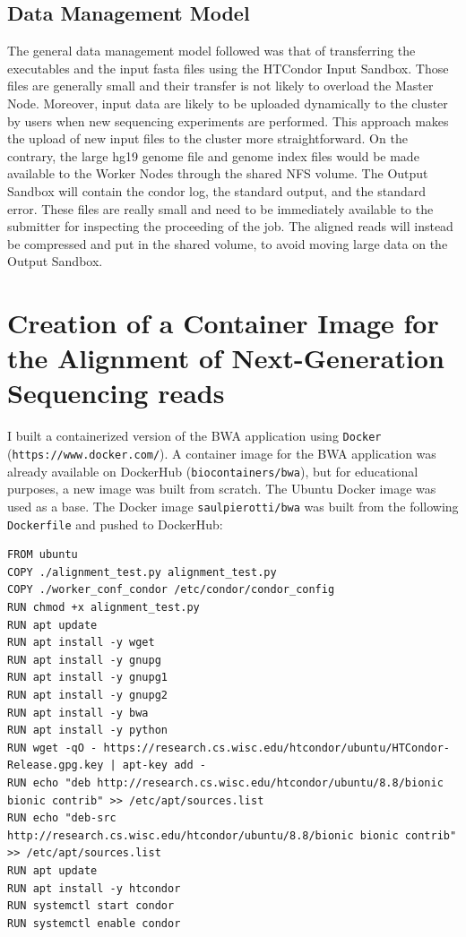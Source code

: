 \documentclass{article}
\begin{document}
\subsection{Data Management Model}
The general data management model followed was that of transferring the executables and the input fasta files using the HTCondor Input Sandbox.
Those files are generally small and their transfer is not likely to overload the Master Node.
Moreover, input data are likely to be uploaded dynamically to the cluster by users when new sequencing experiments are performed.
This approach makes the upload of new input files to the cluster more straightforward.
On the contrary, the large hg19 genome file and genome index files would be made available to the Worker Nodes through the shared NFS volume.
The Output Sandbox will contain the condor log, the standard output, and the standard error.
These files are really small and need to be immediately available to the submitter for inspecting the proceeding of the job.
The aligned reads will instead be compressed and put in the shared volume, to avoid moving large data on the Output Sandbox.

\section{Creation of a Container Image for the Alignment of Next-Generation Sequencing reads}
I built a containerized version of the BWA application using \texttt{Docker} (\texttt{https://www.docker.com/}).
A container image for the BWA application was already available on DockerHub (\texttt{biocontainers/bwa}), but for educational purposes, a new image was built from scratch.
The Ubuntu Docker image was used as a base.
The Docker image \texttt{saulpierotti/bwa} was built from the following \texttt{Dockerfile} and pushed to DockerHub:

\begin{lstlisting}
FROM ubuntu
COPY ./alignment_test.py alignment_test.py
COPY ./worker_conf_condor /etc/condor/condor_config
RUN chmod +x alignment_test.py
RUN apt update
RUN apt install -y wget
RUN apt install -y gnupg
RUN apt install -y gnupg1
RUN apt install -y gnupg2
RUN apt install -y bwa
RUN apt install -y python
RUN wget -qO - https://research.cs.wisc.edu/htcondor/ubuntu/HTCondor-Release.gpg.key | apt-key add -
RUN echo "deb http://research.cs.wisc.edu/htcondor/ubuntu/8.8/bionic bionic contrib" >> /etc/apt/sources.list
RUN echo "deb-src http://research.cs.wisc.edu/htcondor/ubuntu/8.8/bionic bionic contrib" >> /etc/apt/sources.list
RUN apt update
RUN apt install -y htcondor
RUN systemctl start condor
RUN systemctl enable condor
\end{lstlisting}
\end{document}
